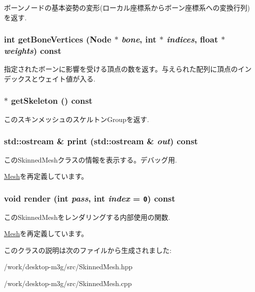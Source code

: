 ボーンノードの基本姿勢の変形(ローカル座標系からボーン座標系への変換行列)を返す. \hypertarget{classm3g_1_1SkinnedMesh_e14038d004d58e797f10fbfa6a9a18d9}{
\subsubsection[{getBoneVertices}]{\setlength{\rightskip}{0pt plus 5cm}int getBoneVertices ({\bf Node} $\ast$ {\em bone}, \/  int $\ast$ {\em indices}, \/  float $\ast$ {\em weights}) const}}
\label{classm3g_1_1SkinnedMesh_e14038d004d58e797f10fbfa6a9a18d9}


指定されたボーンに影響を受ける頂点の数を返す。与えられた配列に頂点のインデックスとウェイト値が入る. \hypertarget{classm3g_1_1SkinnedMesh_ce7d69c2b600f6f01a46214db28e6f92}{
\subsubsection[{getSkeleton}]{ $\ast$ getSkeleton () const}}
\label{classm3g_1_1SkinnedMesh_ce7d69c2b600f6f01a46214db28e6f92}


このスキンメッシュのスケルトンGroupを返す. \hypertarget{classm3g_1_1SkinnedMesh_6fea17fa1532df3794f8cb39cb4f911f}{
\subsubsection[{print}]{\setlength{\rightskip}{0pt plus 5cm}std::ostream \& print (std::ostream \& {\em out}) const}}
\label{classm3g_1_1SkinnedMesh_6fea17fa1532df3794f8cb39cb4f911f}


このSkinnedMeshクラスの情報を表示する。デバッグ用. 

\hyperlink{classm3g_1_1Mesh_6fea17fa1532df3794f8cb39cb4f911f}{Mesh}を再定義しています。\hypertarget{classm3g_1_1SkinnedMesh_1efcb1973989d9963d5bd6d03065d389}{
\subsubsection[{render}]{\setlength{\rightskip}{0pt plus 5cm}void render (int {\em pass}, \/  int {\em index} = {\tt 0}) const}}
\label{classm3g_1_1SkinnedMesh_1efcb1973989d9963d5bd6d03065d389}


このSkinnedMeshをレンダリングする内部使用の関数. 

\hyperlink{classm3g_1_1Mesh_1efcb1973989d9963d5bd6d03065d389}{Mesh}を再定義しています。

このクラスの説明は次のファイルから生成されました:\begin{CompactItemize}
\item 
/work/desktop-m3g/src/SkinnedMesh.hpp\item 
/work/desktop-m3g/src/SkinnedMesh.cpp\end{CompactItemize}
